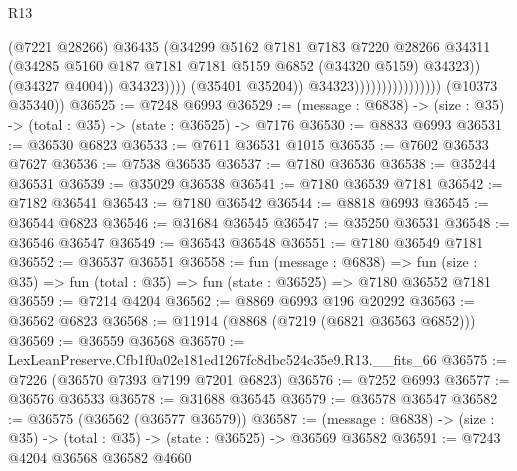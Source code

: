 \begin{lexlean}{R13}
\begin{coremodule}
                                                  (@7221 @28266)
                                                  @36435
                                                  (@34299
                                                    @5162
                                                    @7181
                                                    @7183
                                                    @7220
                                                    @28266
                                                    @34311
                                                    (@34285
                                                      @5160
                                                      @187
                                                      @7181
                                                      @7181
                                                      @5159
                                                      @6852
                                                      (@34320 @5159)
                                                      @34323))
                                                  (@34327 @4004))
                                                @34323))))
                                        (@35401 @35204))
                                      @34323))))))))))))))))
      (@10373 @35340))
@36525 := @7248 @6993
@36529 := (message : @6838) -> (size : @35) -> (total : @35) -> (state : @36525) -> @7176
@36530 := @8833 @6993
@36531 := @36530 @6823
@36533 := @7611 @36531 @1015
@36535 := @7602 @36533 @7627
@36536 := @7538 @36535
@36537 := @7180 @36536
@36538 := @35244 @36531
@36539 := @35029 @36538
@36541 := @7180 @36539 @7181
@36542 := @7182 @36541
@36543 := @7180 @36542
@36544 := @8818 @6993
@36545 := @36544 @6823
@36546 := @31684 @36545
@36547 := @35250 @36531
@36548 := @36546 @36547
@36549 := @36543 @36548
@36551 := @7180 @36549 @7181
@36552 := @36537 @36551
@36558 := fun (message : @6838) =>
  fun (size : @35) => fun (total : @35) => fun (state : @36525) => @7180 @36552 @7181
@36559 := @7214 @4204
@36562 := @8869 @6993 @196 @20292
@36563 := @36562 @6823
@36568 := @11914 (@8868 (@7219 (@6821 @36563 @6852)))
@36569 := @36559 @36568
@36570 := LexLeanPreserve.Cfb1f0a02e181ed1267fc8dbc524c35e9.R13.__fits_66
@36575 := @7226 (@36570 @7393 @7199 @7201 @6823)
@36576 := @7252 @6993
@36577 := @36576 @36533
@36578 := @31688 @36545
@36579 := @36578 @36547
@36582 := @36575 (@36562 (@36577 @36579))
@36587 := (message : @6838) -> (size : @35) -> (total : @35) -> (state : @36525) -> @36569 @36582
@36591 := @7243 @4204 @36568 @36582 @4660

\end{coremodule}
\end{lexlean}
